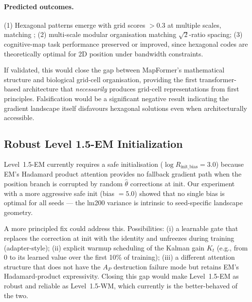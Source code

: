 \paragraph{Predicted outcomes.}
(1) Hexagonal patterns emerge with grid scores $> 0.3$ at multiple
scales, matching \citet{sargolini2006conjunctive};
(2) multi-scale modular organisation matching
\citet{stensola2012modules} $\sqrt{2}$-ratio spacing;
(3) cognitive-map task performance preserved or improved, since
hexagonal codes are theoretically optimal for 2D position under
bandwidth constraints.

If validated, this would close the gap between MapFormer's mathematical
structure and biological grid-cell organisation, providing the first
transformer-based architecture that \emph{necessarily} produces
grid-cell representations from first principles. Falsification would be
a significant negative result indicating the gradient landscape itself
disfavours hexagonal solutions even when architecturally accessible.

\subsection{Robust Level 1.5-EM Initialization}
\label{sec:future:em-init}

Level~1.5-EM currently requires a safe initialisation
($\log R_\mathrm{init\_bias} = 3.0$) because EM's Hadamard product
attention provides no fallback gradient path when the position branch
is corrupted by random $\hat\theta$ corrections at init. Our experiment
with a more aggressive safe init (bias $= 5.0$) showed that no single
bias is optimal for all seeds --- the lm200 variance is intrinsic to
seed-specific landscape geometry.

A more principled fix could address this. Possibilities: (i) a learnable
gate that replaces the correction at init with the identity and unfreezes
during training (adapter-style); (ii) explicit warmup scheduling of the
Kalman gain $K_t$ (e.g., from 0 to its learned value over the first
10\% of training); (iii) a different attention structure that does not
have the $A_P$ destruction failure mode but retains EM's
Hadamard-product expressivity. Closing this gap would make
Level~1.5-EM as robust and reliable as Level~1.5-WM, which currently is
the better-behaved of the two.
